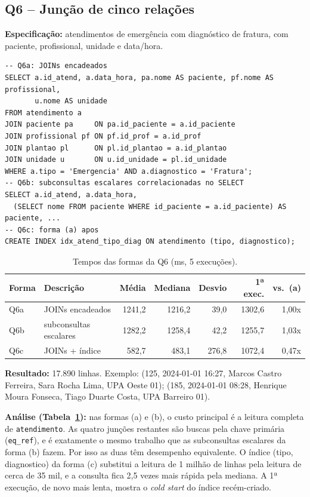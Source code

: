 \documentclass[10pt,a4paper]{article}
\begin{document}
\subsection{Q6 -- Junção de cinco relações}
\textbf{Especificação:} atendimentos de emergência com diagnóstico de fratura, com paciente, profissional, unidade e data/hora.

\begin{lstlisting}
-- Q6a: JOINs encadeados
SELECT a.id_atend, a.data_hora, pa.nome AS paciente, pf.nome AS profissional,
       u.nome AS unidade
FROM atendimento a
JOIN paciente pa     ON pa.id_paciente = a.id_paciente
JOIN profissional pf ON pf.id_prof = a.id_prof
JOIN plantao pl      ON pl.id_plantao = a.id_plantao
JOIN unidade u       ON u.id_unidade = pl.id_unidade
WHERE a.tipo = 'Emergencia' AND a.diagnostico = 'Fratura';
-- Q6b: subconsultas escalares correlacionadas no SELECT
SELECT a.id_atend, a.data_hora,
  (SELECT nome FROM paciente WHERE id_paciente = a.id_paciente) AS paciente, ...
-- Q6c: forma (a) apos
CREATE INDEX idx_atend_tipo_diag ON atendimento (tipo, diagnostico);
\end{lstlisting}

\begin{table}[H]\centering\footnotesize
\caption{Tempos das formas da Q6 (ms, 5 execuções).}\label{tab:q6}
\begin{tabular}{llrrrrr}\toprule
Forma & Descrição & Média & Mediana & Desvio & 1ª exec. & vs.\ (a) \\ \midrule
Q6a & JOINs encadeados           & 1241,2 & 1216,2 &  39,0 & 1302,6 & 1,00x \\
Q6b & subconsultas escalares     & 1282,2 & 1258,4 &  42,2 & 1255,7 & 1,03x \\
Q6c & JOINs + índice             &  582,7 &  483,1 & 276,8 & 1072,4 & 0,47x \\ \bottomrule
\end{tabular}
\end{table}

\textbf{Resultado:} 17.890 linhas. Exemplo: (125, 2024-01-01 16:27, Marcos Castro Ferreira, Sara Rocha Lima, UPA Oeste 01); (185, 2024-01-01 08:28, Henrique Moura Fonseca, Tiago Duarte Costa, UPA Barreiro 01).

\textbf{Análise (Tabela~\ref{tab:q6}):} nas formas (a) e (b), o custo principal é a leitura completa de \texttt{atendimento}. As quatro junções restantes são buscas pela chave primária (\texttt{eq\_ref}), e é exatamente o mesmo trabalho que as subconsultas escalares da forma (b) fazem. Por isso as duas têm desempenho equivalente. O índice (tipo, diagnostico) da forma (c) substitui a leitura de 1 milhão de linhas pela leitura de cerca de 35 mil, e a consulta fica 2,5 vezes mais rápida pela mediana. A 1ª execução, de novo mais lenta, mostra o \emph{cold start} do índice recém-criado.
\end{document}
